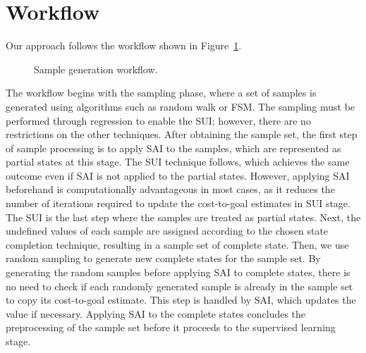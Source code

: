 \section{Workflow}
\label{sec:workflow}

Our approach follows the workflow shown in Figure~\ref{fig:workflow}.

\begin{figure}[ht]
    \caption{Sample generation workflow.}
    \label{fig:workflow}
    \addvspace{\baselineskip}
    \centering
\end{figure}

The workflow begins with the sampling phase, where a set of samples is generated using algorithms such as random walk or FSM. The sampling must be performed through regression to enable the SUI; however, there are no restrictions on the other techniques.
After obtaining the sample set, the first step of sample processing is to apply SAI to the samples, which are represented as partial states at this stage. The SUI technique follows, which achieves the same outcome even if SAI is not applied to the partial states. However, applying SAI beforehand is computationally advantageous in most cases, as it reduces the number of iterations required to update the cost-to-goal estimates in SUI stage.
The SUI is the last step where the samples are treated as partial states. Next, the undefined values of each sample are assigned according to the chosen state completion technique, resulting in a sample set of complete state.
Then, we use random sampling to generate new complete states for the sample set. By generating the random samples before applying SAI to complete states, there is no need to check if each randomly generated sample is already in the sample set to copy its cost-to-goal estimate. This step is handled by SAI, which updates the value if necessary. Applying SAI to the complete states concludes the preprocessing of the sample set before it proceeds to the supervised learning stage.

